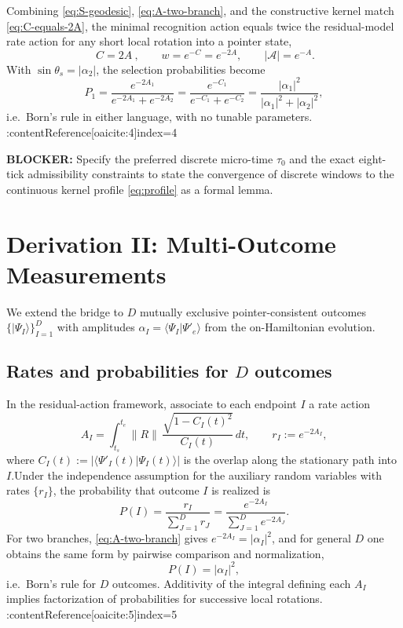 \documentclass[11pt,letterpaper]{article}
\begin{document}
Combining \eqref{eq:S-geodesic}, \eqref{eq:A-two-branch}, and the constructive kernel match \eqref{eq:C-equals-2A}, the minimal recognition action equals twice the residual-model rate action for any short local rotation into a pointer state,
\begin{equation}
\boxed{~C=2A~},
\qquad
w=e^{-C}=e^{-2A},
\qquad
|\mathcal A|=e^{-A}.
\label{eq:two-branch-bridge}
\end{equation}
With \(\sin\theta_s=|\alpha_2|\), the selection probabilities become
\begin{equation}
P_1=\frac{e^{-2A_1}}{e^{-2A_1}+e^{-2A_2}}
=\frac{e^{-C_1}}{e^{-C_1}+e^{-C_2}}
=\frac{|\alpha_1|^2}{|\alpha_1|^2+|\alpha_2|^2},
\end{equation}
i.e.\ Born's rule in either language, with no tunable parameters. :contentReference[oaicite:4]{index=4}

\noindent\textbf{BLOCKER:} Specify the preferred discrete micro-time \(\tau_0\) and the exact eight-tick admissibility constraints to state the convergence of discrete windows to the continuous kernel profile \eqref{eq:profile} as a formal lemma.

\section{Derivation II: Multi-Outcome Measurements}
\label{sec:deriv-ii}

We extend the bridge to \(D\) mutually exclusive pointer-consistent outcomes \(\{|{\Psi_I}\rangle\}_{I=1}^D\) with amplitudes \(\alpha_I=\langle\Psi_I|\Psi'_e\rangle\) from the on-Hamiltonian evolution.

\subsection{Rates and probabilities for \(D\) outcomes}

In the residual-action framework, associate to each endpoint \(I\) a rate action
\begin{equation}
A_I=\int_{t_s}^{t_e}\!\|R\|\,\frac{\sqrt{1-C_I(t)^2}}{C_I(t)}\,dt,
\qquad
r_I:=e^{-2A_I},
\label{eq:AI-def}
\end{equation}
where \(C_I(t):=|\langle\Psi'_I(t)|\Psi_I(t)\rangle|\) is the overlap along the stationary path into \(I\).\;Under the independence assumption for the auxiliary random variables with rates \(\{r_I\}\), the probability that outcome \(I\) is realized is
\begin{equation}
P(I)=\frac{r_I}{\sum_{J=1}^D r_J}
=\frac{e^{-2A_I}}{\sum_{J=1}^D e^{-2A_J}}.
\label{eq:P-rates}
\end{equation}
For two branches, \eqref{eq:A-two-branch} gives \(e^{-2A_I}=|\alpha_I|^2\), and for general \(D\) one obtains the same form by pairwise comparison and normalization,
\begin{equation}
P(I)=|\alpha_I|^2,
\end{equation}
i.e.\ Born's rule for \(D\) outcomes. Additivity of the integral defining each \(A_I\) implies factorization of probabilities for successive local rotations. :contentReference[oaicite:5]{index=5}
\end{document}
